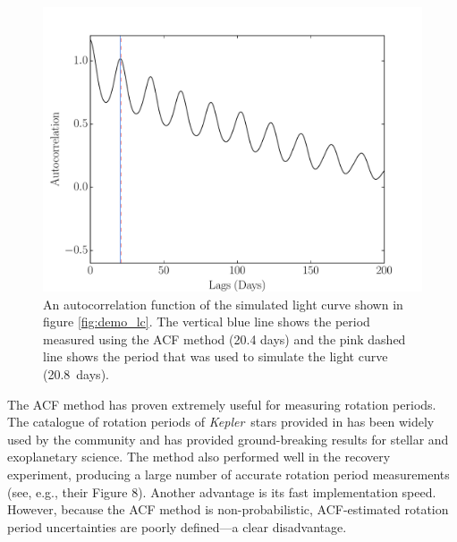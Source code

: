 \documentclass[useAMS, usenatbib, preprint, 12pt]{aastex}
\newcommand{\Kepler}{{\it Kepler}}
\newcommand{\aigrainexampleperiod}{20.8}
\begin{document}
\begin{figure}
\begin{center}
\includegraphics[width=6in, clip=true]{figures/demo_ACF.pdf}
\caption[ACF of a simulated light curve.]
{An autocorrelation function of the simulated light curve shown in figure
\ref{fig:demo_lc}.
The vertical blue line shows the period measured using the ACF method (20.4
days) and the pink dashed line shows the period that was used to simulate the
light curve (\aigrainexampleperiod\ days).}
\label{fig:demo_acf}
\end{center}
\end{figure}

The ACF method has proven extremely useful for measuring rotation periods.
The catalogue of rotation periods of \Kepler\ stars provided in
\citet{Mcquillan2013} has been widely used by the community and has provided
ground-breaking results for stellar and exoplanetary science.
The method also performed well in the \citet{Aigrain2015}
recovery experiment,
producing a large number of accurate rotation period measurements
(see, e.g., their Figure 8).
Another advantage is its fast implementation speed.
However, because the ACF method is non-probabilistic, ACF-estimated
rotation period uncertainties are poorly defined---a clear
disadvantage.
\end{document}

